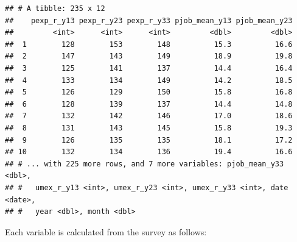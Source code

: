 \documentclass[]{book}
\theoremstyle{definition}
\theoremstyle{definition}
\theoremstyle{remark}
\begin{document}
\begin{verbatim}
## # A tibble: 235 x 12
##    pexp_r_y13 pexp_r_y23 pexp_r_y33 pjob_mean_y13 pjob_mean_y23
##         <int>      <int>      <int>         <dbl>         <dbl>
##  1        128        153        148          15.3          16.6
##  2        147        143        149          18.9          19.8
##  3        125        141        137          14.4          16.4
##  4        133        134        149          14.2          18.5
##  5        126        129        150          15.8          16.8
##  6        128        139        137          14.4          14.8
##  7        132        142        146          17.0          18.6
##  8        131        143        145          15.8          19.3
##  9        126        135        135          18.1          17.2
## 10        132        134        136          19.4          16.6
## # ... with 225 more rows, and 7 more variables: pjob_mean_y33 <dbl>,
## #   umex_r_y13 <int>, umex_r_y23 <int>, umex_r_y33 <int>, date <date>,
## #   year <dbl>, month <dbl>
\end{verbatim}

Each variable is calculated from the survey as follows:
\end{document}
